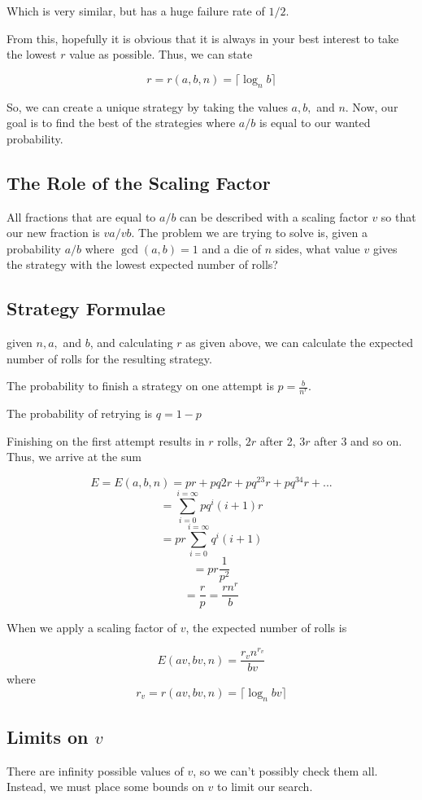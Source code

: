 \documentclass{article}
\begin{document}
Which is very similar, but has a huge failure rate of $1/2$.

From this, hopefully it is obvious that it is always in your best interest to take the lowest $r$ value as possible. Thus, we can state

$$r=r(a,b,n)=\lceil\log_n b\rceil$$

So, we can create a unique strategy by taking the values $a, b,$ and $n$. Now, our goal is to find the best of the strategies where $a/b$ is equal to our wanted probability.

\subsection{The Role of the Scaling Factor}
All fractions that are equal to $a/b$ can be described with a scaling factor $v$ so that our new fraction is $va/vb$. The problem we are trying to solve is, given a probability $a/b$ where $\gcd(a,b)=1$ and a die of $n$ sides, what value $v$ gives the strategy with the lowest expected number of rolls?

\subsection{Strategy Formulae}
given $n, a,$ and $b$, and calculating $r$ as given above, we can calculate the expected number of rolls for the resulting strategy.\newline

The probability to finish a strategy on one attempt is $p=\frac{b}{n^r}$. \newline

The probability of retrying is $q=1-p$ \newline

Finishing on the first attempt results in $r$ rolls, $2r$ after 2, $3r$ after 3 and so on. Thus, we arrive at the sum

$$E=E(a,b,n) = pr+pq2r+pq^23r+pq^34r+...$$
$$= \sum_{i=0}^{i=\infty}pq^i(i+1)r$$
$$= pr\sum_{i=0}^{i=\infty}q^i(i+1)$$
$$=pr\frac{1}{p^2}$$
$$=\frac{r}{p} = \frac{rn^r}{b}$$

When we apply a scaling factor of $v$, the expected number of rolls is

$$E(av,bv,n) = \frac{r_vn^{r_v}}{bv}$$
where
$$r_v=r(av,bv,n)=\lceil\log_n bv\rceil$$

\subsection{Limits on $v$}
There are infinity possible values of $v$, so we can't possibly check them all. Instead, we must place some bounds on $v$ to limit our search.\newline
\end{document}
